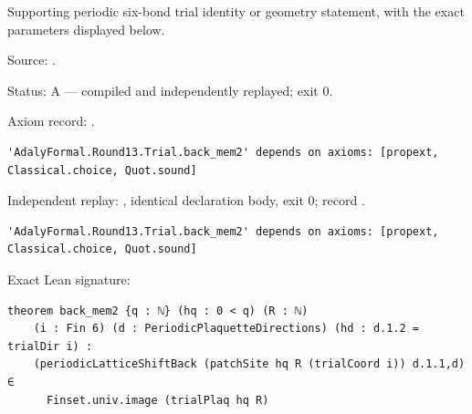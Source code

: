 \begin{theorem}[bp-391]
\label{bp-391}
\leanok
Supporting periodic six-bond trial identity or geometry statement, with the exact parameters displayed below.

\par Source: \texttt{}.
\par Status: A — compiled and independently replayed; exit 0.
\par Axiom record: \texttt{}.
\begin{verbatim}
'AdalyFormal.Round13.Trial.back_mem2' depends on axioms: [propext, Classical.choice, Quot.sound]
\end{verbatim}
\par Independent replay: \texttt{}, identical declaration body, exit 0; record \texttt{}.
\begin{verbatim}
'AdalyFormal.Round13.Trial.back_mem2' depends on axioms: [propext, Classical.choice, Quot.sound]
\end{verbatim}
\par Exact Lean signature:
\begin{verbatim}
theorem back_mem2 {q : ℕ} (hq : 0 < q) (R : ℕ)
    (i : Fin 6) (d : PeriodicPlaquetteDirections) (hd : d.1.2 = trialDir i) :
    (periodicLatticeShiftBack (patchSite hq R (trialCoord i)) d.1.1,d) ∈
      Finset.univ.image (trialPlaq hq R)
\end{verbatim}
\end{theorem}

